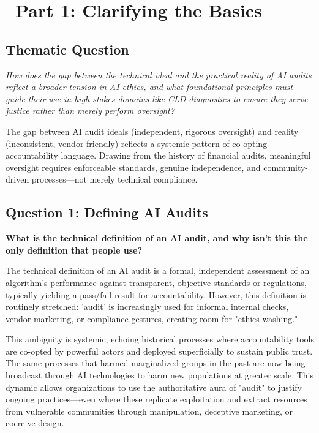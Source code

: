 \documentclass[12pt,letterpaper]{article}
\begin{document}
\newpage

\section*{\color{primaryblue}\faCogs\ Part 1: Clarifying the Basics}

\subsection*{Thematic Question}
\textit{How does the gap between the technical ideal and the practical reality of AI audits reflect a broader tension in AI ethics, and what foundational principles must guide their use in high-stakes domains like CLD diagnostics to ensure they serve justice rather than merely perform oversight?}

\begin{keyfindings}
The gap between AI audit ideals (independent, rigorous oversight) and reality (inconsistent, vendor-friendly) reflects a systemic pattern of co-opting accountability language. Drawing from the history of financial audits, meaningful oversight requires enforceable standards, genuine independence, and community-driven processes—not merely technical compliance.
\end{keyfindings}

\subsection*{Question 1: Defining AI Audits}
\textbf{What is the technical definition of an AI audit, and why isn't this the only definition that people use?}

The technical definition of an AI audit is a formal, independent assessment of an algorithm's performance against transparent, objective standards or regulations, typically yielding a pass/fail result for accountability. However, this definition is routinely stretched: 'audit' is increasingly used for informal internal checks, vendor marketing, or compliance gestures, creating room for "ethics washing."

This ambiguity is systemic, echoing historical processes where accountability tools are co-opted by powerful actors and deployed superficially to sustain public trust. The same processes that harmed marginalized groups in the past are now being broadcast through AI technologies to harm new populations at greater scale. This dynamic allows organizations to use the authoritative aura of "audit" to justify ongoing practices—even where these replicate exploitation and extract resources from vulnerable communities through manipulation, deceptive marketing, or coercive design.
\end{document}
